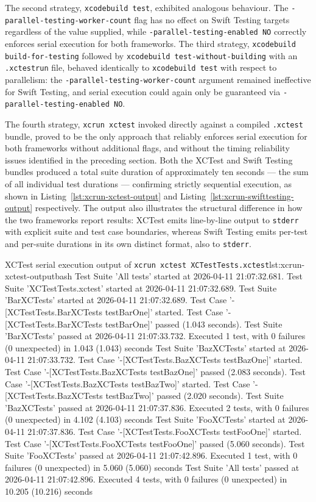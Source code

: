 The second strategy, \texttt{xcodebuild test}, exhibited analogous behaviour. The
\texttt{-parallel-testing-worker-count} flag has no effect on Swift Testing targets
regardless of the value supplied, while \texttt{-parallel-testing-enabled NO}
correctly enforces serial execution for both frameworks. The third strategy,
\texttt{xcodebuild build-for-testing} followed by \texttt{xcodebuild
test-without-building} with an \texttt{.xctestrun} file, behaved identically to
\texttt{xcodebuild test} with respect to parallelism: the
\texttt{-parallel-testing-worker-count} argument remained ineffective for Swift
Testing, and serial execution could again only be guaranteed via
\texttt{-parallel-testing-enabled NO}.

The fourth strategy, \texttt{xcrun xctest} invoked directly against a compiled
\texttt{.xctest} bundle, proved to be the only approach that reliably enforces serial
execution for both frameworks without additional flags, and without the timing
reliability issues identified in the preceding section. Both the XCTest and Swift
Testing bundles produced a total suite duration of approximately ten seconds ---
the sum of all individual test durations --- confirming strictly sequential execution,
as shown in Listing~\ref{lst:xcrun-xctest-output} and
Listing~\ref{lst:xcrun-swifttesting-output} respectively. The output also illustrates
the structural difference in how the two frameworks report results: XCTest emits
line-by-line output to \texttt{stderr} with explicit suite and test case boundaries,
whereas Swift Testing emits per-test and per-suite durations in its own distinct
format, also to \texttt{stderr}.

\begin{codeblock}{XCTest serial execution output of \texttt{xcrun xctest XCTestTests.xctest}}{lst:xcrun-xctest-output}{bash}
Test Suite 'All tests' started at 2026-04-11 21:07:32.681.
Test Suite 'XCTestTests.xctest' started at 2026-04-11 21:07:32.689.
Test Suite 'BarXCTests' started at 2026-04-11 21:07:32.689.
Test Case '-[XCTestTests.BarXCTests testBarOne]' started.
Test Case '-[XCTestTests.BarXCTests testBarOne]' passed (1.043 seconds).
Test Suite 'BarXCTests' passed at 2026-04-11 21:07:33.732.
     Executed 1 test, with 0 failures (0 unexpected) in 1.043 (1.043) seconds
Test Suite 'BazXCTests' started at 2026-04-11 21:07:33.732.
Test Case '-[XCTestTests.BazXCTests testBazOne]' started.
Test Case '-[XCTestTests.BazXCTests testBazOne]' passed (2.083 seconds).
Test Case '-[XCTestTests.BazXCTests testBazTwo]' started.
Test Case '-[XCTestTests.BazXCTests testBazTwo]' passed (2.020 seconds).
Test Suite 'BazXCTests' passed at 2026-04-11 21:07:37.836.
     Executed 2 tests, with 0 failures (0 unexpected) in 4.102 (4.103) seconds
Test Suite 'FooXCTests' started at 2026-04-11 21:07:37.836.
Test Case '-[XCTestTests.FooXCTests testFooOne]' started.
Test Case '-[XCTestTests.FooXCTests testFooOne]' passed (5.060 seconds).
Test Suite 'FooXCTests' passed at 2026-04-11 21:07:42.896.
     Executed 1 test, with 0 failures (0 unexpected) in 5.060 (5.060) seconds
Test Suite 'All tests' passed at 2026-04-11 21:07:42.896.
     Executed 4 tests, with 0 failures (0 unexpected) in 10.205 (10.216) seconds
\end{codeblock}

